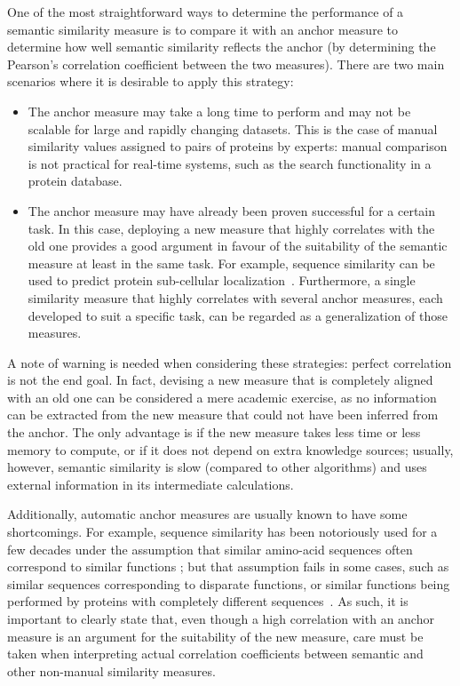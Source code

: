 One of the most straightforward ways to determine the performance of a semantic similarity measure is to compare it with an anchor measure to determine how well semantic similarity reflects the anchor (\eg by determining the Pearson's correlation coefficient between the two measures). There are two main scenarios where it is desirable to apply this strategy:
\begin{itemize}
    \item The anchor measure may take a long time to perform and may not be scalable for large and rapidly changing datasets. This is the case of manual similarity values assigned to pairs of proteins by experts: manual comparison is not practical for real-time systems, such as the search functionality in a protein database.
    \item The anchor measure may have already been proven successful for a certain task. In this case, deploying a new measure that highly correlates with the old one provides a good argument in favour of the suitability of the semantic measure at least in the same task. For example, sequence similarity can be used to predict protein sub-cellular localization~\citep{Nair2002}. Furthermore, a single similarity measure that highly correlates with several anchor measures, each developed to suit a specific task, can be regarded as a generalization of those measures.
\end{itemize}

A note of warning is needed when considering these strategies: perfect correlation is not the end goal. In fact, devising a new measure that is completely aligned with an old one can be considered a mere academic exercise, as no information can be extracted from the new measure that could not have been inferred from the anchor. The only advantage is if the new measure takes less time or less memory to compute, or if it does not depend on extra knowledge sources; usually, however, semantic similarity is slow (compared to other algorithms) and uses external information in its intermediate calculations.

Additionally, automatic anchor measures are usually known to have some shortcomings. For example, sequence similarity has been notoriously used for a few decades under the assumption that similar amino-acid sequences often correspond to similar functions \citep[\eg][]{Bork1998}; but that assumption fails in some cases, such as similar sequences corresponding to disparate functions, or similar functions being performed by proteins with completely different sequences~\citep{Whisstock2003,Watson2005}. As such, it is important to clearly state that, even though a high correlation with an anchor measure is an argument for the suitability of the new measure, care must be taken when interpreting actual correlation coefficients between semantic and other non-manual similarity measures.

